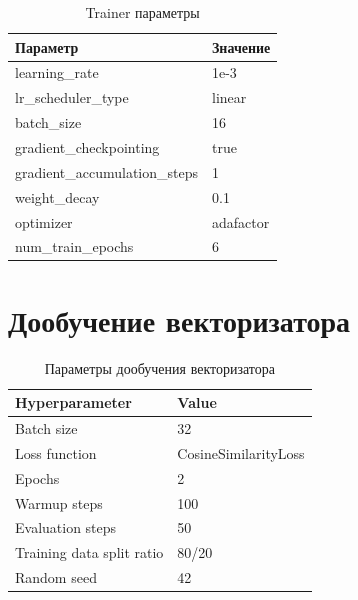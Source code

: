 \begin{longtable}{ll}
\caption{Trainer параметры} \\
\hline
\textbf{Параметр} & \textbf{Значение} \\
\hline
learning\_rate & 1e-3 \\
lr\_scheduler\_type & linear \\
batch\_size & 16 \\
gradient\_checkpointing & true \\
gradient\_accumulation\_steps & 1 \\
weight\_decay & 0.1 \\
optimizer & adafactor \\
num\_train\_epochs & 6 \\
\hline
\end{longtable}

\chapter{Дообучение векторизатора}

\begin{table}[H]
\centering
\begin{tabular}{|l|l|}
\hline
\textbf{Hyperparameter}    & \textbf{Value} \\ \hline
Batch size                 & 32    \\ \hline
Loss function              & CosineSimilarityLoss \\ \hline
Epochs                     & 2     \\ \hline
Warmup steps               & 100   \\ \hline
Evaluation steps           & 50    \\ \hline
Training data split ratio  & 80/20 \\ \hline
Random seed                & 42    \\ \hline
\end{tabular}
\caption{Параметры дообучения векторизатора}
\label{tab:hyperparameters}
\end{table}
